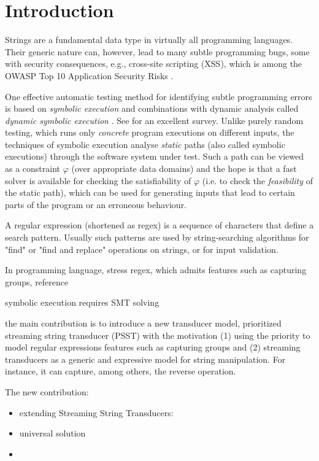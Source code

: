 
\section{Introduction}



Strings are a fundamental data type in virtually all programming languages.
Their generic nature can, however, lead to many subtle programming
bugs, some with security consequences, e.g., cross-site scripting
(XSS), which is among the OWASP Top 10 Application Security Risks
\cite{owasp17}. 

One effective
automatic testing method for identifying subtle programming errors
is based on \emph{symbolic execution}
\cite{king76} and combinations with dynamic analysis
called \emph{dynamic symbolic execution} \cite{jalangi,DART,EXE,CUTE,KLEE}.
See \cite{symbex-survey} for an excellent survey. Unlike purely random testing,
which runs only \emph{concrete} program executions on different
inputs, the techniques of symbolic execution analyse \emph{static} paths
(also called symbolic executions) through the software system under test.
Such a path can be viewed as a constraint $\varphi$ (over
appropriate data domains) and the hope is that a fast
solver is available for checking the satisfiability of $\varphi$ (i.e. to check
the \emph{feasibility} of the static path), which can be used for generating
inputs that lead to certain parts of the program or an erroneous behaviour.


A regular expression (shortened as regex) is a sequence of characters that define a search pattern. Usually such patterns are used by string-searching algorithms for "find" or "find and replace" operations on strings, or for input validation.  


In programming language, stress regex, which admits features such as capturing groups, reference


symbolic execution requires SMT solving 

the main contribution is to introduce  a new transducer model, prioritized streaming string transducer (PSST) with the  motivation 
(1) using the priority to model regular expressions features such as capturing groups and (2) streaming transducers as a generic and expressive model for string manipulation. For instance, it can capture, among others, the reverse operation. 

The new contribution: 

\begin{itemize}
	\item extending Streaming String Transducers: \cite{FR17}
	
	\item  universal solution 
	
	\item 
\end{itemize} 
